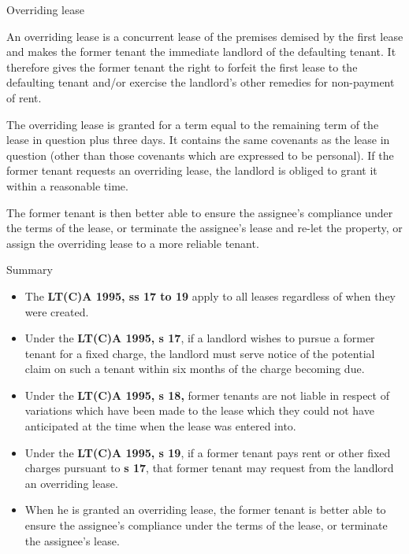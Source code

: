 \documentclass[
]{article}
\providecommand{\tightlist}{%
  \setlength{\itemsep}{0pt}\setlength{\parskip}{0pt}}
\newenvironment{env-ab392b14-a05f-4d9a-80eb-a63d00eb59ea}
{
    \savenotes\tcolorbox[blanker,breakable,left=5pt,borderline west={2pt}{-4pt}{gold}]
}
{
    \endtcolorbox\spewnotes
}
\begin{document}
\begin{env-ab392b14-a05f-4d9a-80eb-a63d00eb59ea}

Overriding lease

An overriding lease is a concurrent lease of the premises demised by the
first lease and makes the former tenant the immediate landlord of the
defaulting tenant. It therefore gives the former tenant the right to
forfeit the first lease to the defaulting tenant and/or exercise the
landlord's other remedies for non-payment of rent.

\end{env-ab392b14-a05f-4d9a-80eb-a63d00eb59ea}

The overriding lease is granted for a term equal to the remaining term
of the lease in question plus three days. It contains the same covenants
as the lease in question (other than those covenants which are expressed
to be personal). If the former tenant requests an overriding lease, the
landlord is obliged to grant it within a reasonable time.

The former tenant is then better able to ensure the assignee's
compliance under the terms of the lease, or terminate the assignee's
lease and re-let the property, or assign the overriding lease to a more
reliable tenant.

Summary

\begin{itemize}
\tightlist
\item
  The \textbf{LT(C)A 1995, ss 17 to 19} apply to all leases regardless
  of when they were created.
\item
  Under the \textbf{LT(C)A 1995, s 17}, if a landlord wishes to pursue a
  former tenant for a fixed charge, the landlord must serve notice of
  the potential claim on such a tenant within six months of the charge
  becoming due.
\item
  Under the \textbf{LT(C)A 1995, s 18,} former tenants are not liable in
  respect of variations which have been made to the lease which they
  could not have anticipated at the time when the lease was entered
  into.
\item
  Under the \textbf{LT(C)A 1995, s 19}, if a former tenant pays rent or
  other fixed charges pursuant to \textbf{s 17}, that former tenant may
  request from the landlord an overriding lease.
\item
  When he is granted an overriding lease, the former tenant is better
  able to ensure the assignee's compliance under the terms of the lease,
  or terminate the assignee's lease.
\end{itemize}
\end{document}
